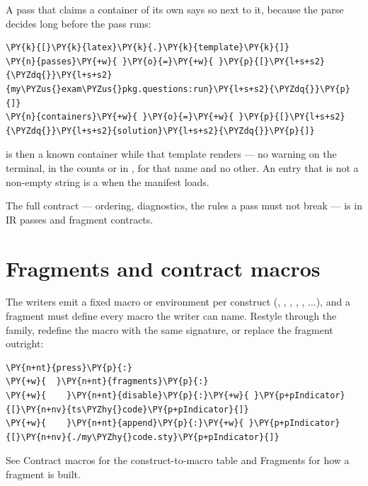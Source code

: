 \documentclass[a4paper,twoside]{article}
\begin{document}
A pass that claims a container of its own says so next to it, because the parse
decides long before the pass runs:
\begin{tscode}[lang=toml, engine=pygments]
\begin{Verbatim}[commandchars=\\\{\},breaklines, breakanywhere, commandchars=\\\{\}]
\PY{k}{[}\PY{k}{latex}\PY{k}{.}\PY{k}{template}\PY{k}{]}
\PY{n}{passes}\PY{+w}{ }\PY{o}{=}\PY{+w}{ }\PY{p}{[}\PY{l+s+s2}{\PYZdq{}}\PY{l+s+s2}{my\PYZus{}exam\PYZus{}pkg.questions:run}\PY{l+s+s2}{\PYZdq{}}\PY{p}{]}
\PY{n}{containers}\PY{+w}{ }\PY{o}{=}\PY{+w}{ }\PY{p}{[}\PY{l+s+s2}{\PYZdq{}}\PY{l+s+s2}{solution}\PY{l+s+s2}{\PYZdq{}}\PY{p}{]}
\end{Verbatim}
\end{tscode}
 is then a known container while that template renders --- no
 warning on the terminal, in the counts or in
, for that name and no other. An entry that is not a
non-empty string is a  when the manifest loads.

The full contract --- ordering, diagnostics, the rules a pass must not break --- is
in IR passes and fragment contracts.
\section{Fragments and contract macros}
The writers emit a fixed macro or environment per construct (,
, , , , ...), and a fragment must define
every macro the writer can name. Restyle through the  family, redefine
the macro with the same signature, or replace the fragment outright:
\begin{tscode}[lang=yaml, engine=pygments]
\begin{Verbatim}[commandchars=\\\{\},breaklines, breakanywhere, commandchars=\\\{\}]
\PY{n+nt}{press}\PY{p}{:}
\PY{+w}{  }\PY{n+nt}{fragments}\PY{p}{:}
\PY{+w}{    }\PY{n+nt}{disable}\PY{p}{:}\PY{+w}{ }\PY{p+pIndicator}{[}\PY{n+nv}{ts\PYZhy{}code}\PY{p+pIndicator}{]}
\PY{+w}{    }\PY{n+nt}{append}\PY{p}{:}\PY{+w}{ }\PY{p+pIndicator}{[}\PY{n+nv}{./my\PYZhy{}code.sty}\PY{p+pIndicator}{]}
\end{Verbatim}
\end{tscode}
See Contract macros for the construct-to-macro table
and Fragments for how a fragment is built.
\end{document}

